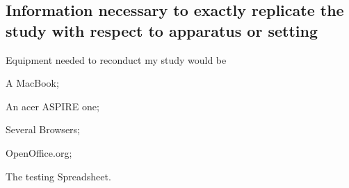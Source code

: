 \documentclass[12pt,oneside,letterpaper,titlepage]{article}
\begin{document}

\subsection{Information necessary to exactly replicate the study with respect to apparatus or setting}

Equipment needed to reconduct my study would be
\begin{inparaenum}[(1)]
\item A MacBook;
\item An acer ASPIRE one;
\item Several Browsers;
\item OpenOffice.org;
\item The testing Spreadsheet.
\end{inparaenum}
\end{document}

